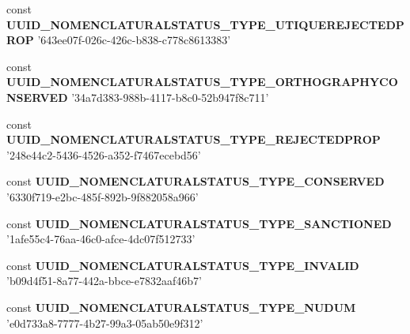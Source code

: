 \begin{DoxyCompactItemize}
\item 
\hypertarget{uuids_8php_a732caf49cb6385e18e2f2f43dc109efd}{const {\bfseries U\-U\-I\-D\-\_\-\-N\-O\-M\-E\-N\-C\-L\-A\-T\-U\-R\-A\-L\-S\-T\-A\-T\-U\-S\-\_\-\-T\-Y\-P\-E\-\_\-\-U\-T\-I\-Q\-U\-E\-R\-E\-J\-E\-C\-T\-E\-D\-P\-R\-O\-P} '643ee07f-\/026c-\/426c-\/b838-\/c778c8613383'}\label{uuids_8php_a732caf49cb6385e18e2f2f43dc109efd}

\item 
\hypertarget{uuids_8php_a2580f1c5124464eb08802a1884873fec}{const {\bfseries U\-U\-I\-D\-\_\-\-N\-O\-M\-E\-N\-C\-L\-A\-T\-U\-R\-A\-L\-S\-T\-A\-T\-U\-S\-\_\-\-T\-Y\-P\-E\-\_\-\-O\-R\-T\-H\-O\-G\-R\-A\-P\-H\-Y\-C\-O\-N\-S\-E\-R\-V\-E\-D} '34a7d383-\/988b-\/4117-\/b8c0-\/52b947f8c711'}\label{uuids_8php_a2580f1c5124464eb08802a1884873fec}

\item 
\hypertarget{uuids_8php_abc079018790c9b2d7cbf3db578e40bf9}{const {\bfseries U\-U\-I\-D\-\_\-\-N\-O\-M\-E\-N\-C\-L\-A\-T\-U\-R\-A\-L\-S\-T\-A\-T\-U\-S\-\_\-\-T\-Y\-P\-E\-\_\-\-R\-E\-J\-E\-C\-T\-E\-D\-P\-R\-O\-P} '248e44c2-\/5436-\/4526-\/a352-\/f7467ecebd56'}\label{uuids_8php_abc079018790c9b2d7cbf3db578e40bf9}

\item 
\hypertarget{uuids_8php_a58cc711dd93d4f08bd7cdb7935134987}{const {\bfseries U\-U\-I\-D\-\_\-\-N\-O\-M\-E\-N\-C\-L\-A\-T\-U\-R\-A\-L\-S\-T\-A\-T\-U\-S\-\_\-\-T\-Y\-P\-E\-\_\-\-C\-O\-N\-S\-E\-R\-V\-E\-D} '6330f719-\/e2bc-\/485f-\/892b-\/9f882058a966'}\label{uuids_8php_a58cc711dd93d4f08bd7cdb7935134987}

\item 
\hypertarget{uuids_8php_a0bb5ad6d9d36bacbc016439ecfcb99f4}{const {\bfseries U\-U\-I\-D\-\_\-\-N\-O\-M\-E\-N\-C\-L\-A\-T\-U\-R\-A\-L\-S\-T\-A\-T\-U\-S\-\_\-\-T\-Y\-P\-E\-\_\-\-S\-A\-N\-C\-T\-I\-O\-N\-E\-D} '1afe55c4-\/76aa-\/46c0-\/afce-\/4dc07f512733'}\label{uuids_8php_a0bb5ad6d9d36bacbc016439ecfcb99f4}

\item 
\hypertarget{uuids_8php_a3ba7b77f5dd0d0aa5347b8fb5eff9ba1}{const {\bfseries U\-U\-I\-D\-\_\-\-N\-O\-M\-E\-N\-C\-L\-A\-T\-U\-R\-A\-L\-S\-T\-A\-T\-U\-S\-\_\-\-T\-Y\-P\-E\-\_\-\-I\-N\-V\-A\-L\-I\-D} 'b09d4f51-\/8a77-\/442a-\/bbce-\/e7832aaf46b7'}\label{uuids_8php_a3ba7b77f5dd0d0aa5347b8fb5eff9ba1}

\item 
\hypertarget{uuids_8php_aef0897e1d4ba3b9ef5fb389308a9958d}{const {\bfseries U\-U\-I\-D\-\_\-\-N\-O\-M\-E\-N\-C\-L\-A\-T\-U\-R\-A\-L\-S\-T\-A\-T\-U\-S\-\_\-\-T\-Y\-P\-E\-\_\-\-N\-U\-D\-U\-M} 'e0d733a8-\/7777-\/4b27-\/99a3-\/05ab50e9f312'}\label{uuids_8php_aef0897e1d4ba3b9ef5fb389308a9958d}


\end{DoxyCompactItemize}
